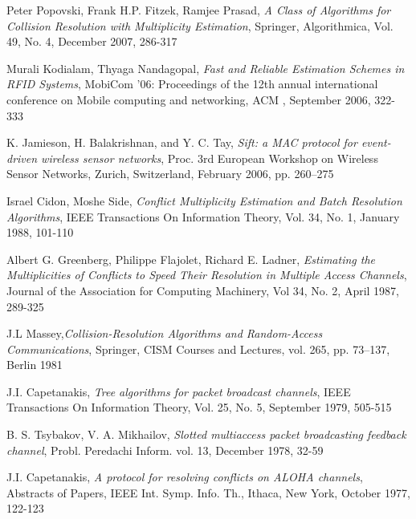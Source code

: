 \begin{thebibliography}{99}
 
  Peter Popovski, Frank H.P. Fitzek, Ramjee Prasad, \emph{ A Class of Algorithms for Collision Resolution with Multiplicity Estimation}, Springer, Algorithmica, Vol. 49, No. 4, December 2007, 286-317
  
Murali Kodialam, Thyaga Nandagopal, \emph{Fast and Reliable Estimation Schemes in RFID Systems}, MobiCom '06: Proceedings of the 12th annual international conference on Mobile computing and networking, ACM , September 2006, 322-333 
 
K. Jamieson, H. Balakrishnan, and Y. C. Tay, \emph{Sift: a MAC protocol for event-driven wireless sensor networks},  Proc. 3rd European Workshop on Wireless Sensor Networks, Zurich, Switzerland, February 2006, pp. 260–275 

 Israel Cidon, Moshe Side, \emph{Conflict Multiplicity Estimation and Batch Resolution Algorithms}, IEEE Transactions On Information Theory, Vol. 34, No. 1, January 1988, 101-110
 
  Albert G. Greenberg, Philippe Flajolet,  Richard E. Ladner,
  \emph{Estimating the Multiplicities of Conflicts to Speed Their Resolution in Multiple Access Channels},
  Journal of the Association for Computing Machinery,
  Vol 34, No. 2, April 1987, 289-325
 
  J.L Massey,\emph{Collision-Resolution Algorithms and Random-Access Communications}, Springer, CISM Courses and Lectures, vol. 265, pp. 73–137, Berlin 1981
  
  J.I. Capetanakis, \emph{ Tree algorithms for packet broadcast channels}, IEEE Transactions On Information Theory, Vol. 25, No. 5, September 1979, 505-515
 
B. S. Tsybakov, V. A. Mikhailov, \emph{Slotted multiaccess packet broadcasting feedback channel}, Probl. Peredachi Inform. vol. 13, December 1978, 32-59
 
J.I. Capetanakis, \emph{A protocol for resolving conflicts on ALOHA channels}, Abstracts of Papers, IEEE Int. Symp. Info. Th., Ithaca, New York, October 1977, 122-123

 \end{thebibliography}
 
